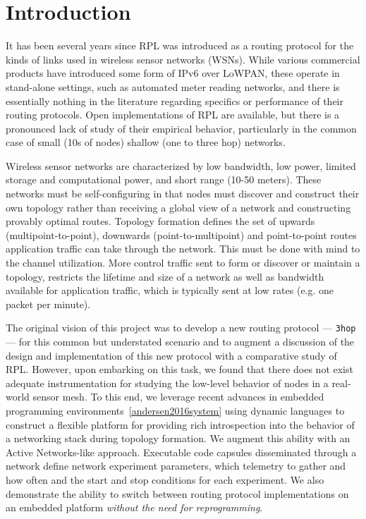\section{Introduction}

It has been several years since RPL was introduced as a routing protocol for the kinds of links used in wireless sensor networks (WSNs).
While various commercial products have introduced some form of IPv6 over LoWPAN, these operate in stand-alone settings, such as automated meter reading networks, and there is essentially nothing in the literature regarding specifics or performance of their routing protocols.
Open implementations of RPL are available, but there is a pronounced lack of study of their empirical behavior, particularly in the common case of small (10s of nodes) shallow (one to three hop) networks.

Wireless sensor networks are characterized by low bandwidth, low power, limited storage and computational power, and short range (10-50 meters).
These networks must be self-configuring in that nodes must discover and construct their own topology rather than receiving a global view of a network and constructing provably optimal routes.
Topology formation defines the set of upwards (multipoint-to-point), downwards (point-to-multipoint) and point-to-point routes application traffic can take through the network.
This must be done with mind to the channel utilization.
More control traffic sent to form or discover or maintain a topology, restricts the lifetime and size of a network as well as bandwidth available for application traffic, which is typically sent at low rates (e.g. one packet per minute).

The original vision of this project was to develop a new routing protocol --- \texttt{3hop} --- for this common but understated scenario and to augment a discussion of the design and implementation of this new protocol with a comparative study of RPL.
However, upon embarking on this task, we found that there does not exist adequate instrumentation for studying the low-level behavior of nodes in a real-world sensor mesh.
To this end, we leverage recent advances in embedded programming environments~\ref{andersen2016system} using dynamic languages to construct a flexible platform for providing rich introspection into the behavior of a networking stack during topology formation.
We augment this ability with an Active Networks-like approach. 
Executable code capsules disseminated through a network define network experiment parameters, which telemetry to gather and how often and the start and stop conditions for each experiment.
We also demonstrate the ability to switch between routing protocol implementations on an embedded platform \emph{without the need for reprogramming}.

